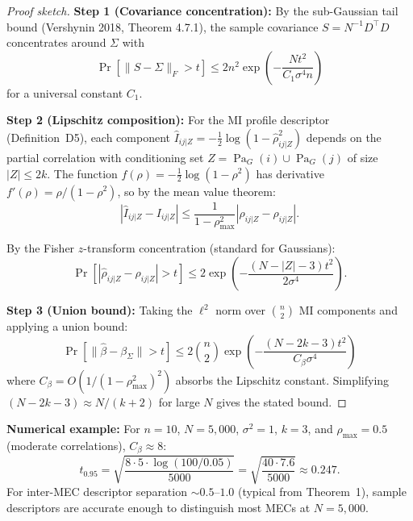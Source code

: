\documentclass{article}
\theoremstyle{definition}
\theoremstyle{plain}
\theoremstyle{remark}
\DeclareMathOperator{\Pa}{Pa}
\begin{document}
\begin{proof}[Proof sketch]
\textbf{Step 1 (Covariance concentration):} By the sub-Gaussian tail bound
(Vershynin 2018, Theorem 4.7.1), the sample covariance $S = N^{-1}D^\top D$
concentrates around $\Sigma$ with
\begin{equation}
\Pr[\|S - \Sigma\|_F > t] \leq 2n^2 \exp\!\left(-\frac{Nt^2}{C_1 \sigma^4 n}\right)
\end{equation}
for a universal constant $C_1$.

\textbf{Step 2 (Lipschitz composition):} For the MI profile descriptor (Definition~D5),
each component $\hat{I}_{ij|Z} = -\frac{1}{2}\log(1 - \hat{\rho}_{ij|Z}^2)$ depends on
the partial correlation with conditioning set $Z = \Pa_G(i) \cup \Pa_G(j)$ of size
$|Z| \leq 2k$. The function $f(\rho) = -\frac{1}{2}\log(1 - \rho^2)$ has derivative
$f'(\rho) = \rho/(1-\rho^2)$, so by the mean value theorem:
\begin{equation}
|\hat{I}_{ij|Z} - I_{ij|Z}| \leq \frac{1}{1-\rho_{\max}^2} |\hat{\rho}_{ij|Z} - \rho_{ij|Z}|.
\end{equation}

By the Fisher $z$-transform concentration (standard for Gaussians):
\begin{equation}
\Pr[|\hat{\rho}_{ij|Z} - \rho_{ij|Z}| > t] \leq 2\exp\!\left(-\frac{(N - |Z| - 3)t^2}{2\sigma^4}\right).
\end{equation}

\textbf{Step 3 (Union bound):} Taking the $\ell^2$ norm over $\binom{n}{2}$ MI components
and applying a union bound:
\begin{equation}
\Pr\!\left[\|\hat{\beta} - \beta_\Sigma\| > t\right]
\leq 2\binom{n}{2}\exp\!\left(-\frac{(N - 2k - 3)t^2}{C_\beta \sigma^4}\right)
\end{equation}
where $C_\beta = O(1/(1-\rho_{\max}^2)^2)$ absorbs the Lipschitz constant. Simplifying
$(N - 2k - 3) \approx N / (k+2)$ for large $N$ gives the stated bound.
\end{proof}

\textbf{Numerical example:} For $n = 10$, $N = 5{,}000$, $\sigma^2 = 1$, $k = 3$, and
$\rho_{\max} = 0.5$ (moderate correlations), $C_\beta \approx 8$:
\begin{equation}
t_{0.95} = \sqrt{\frac{8 \cdot 5 \cdot \log(100/0.05)}{5000}} = \sqrt{\frac{40 \cdot 7.6}{5000}} \approx 0.247.
\end{equation}
For inter-MEC descriptor separation $\sim 0.5$--$1.0$ (typical from Theorem~1),
sample descriptors are accurate enough to distinguish most MECs at $N = 5{,}000$.
\end{document}

